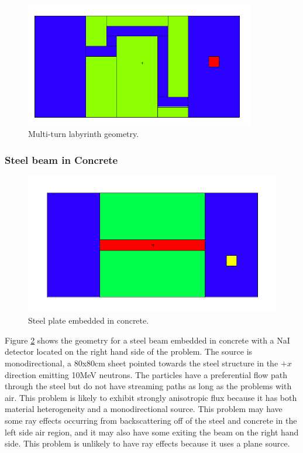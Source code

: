 \begin{figure}[h!]
  \centering
  \includegraphics[width=10cm]{./chapters/characterization_probs/figures/geometries/maze1.png}
  \caption[Multi-turn labyrinth geometry.]{Multi-turn labyrinth geometry.}
  \label{fig:maze1geom}
\end{figure}

\subsubsection*{Steel beam in Concrete}

\begin{figure}[h!]
  \centering
  \includegraphics[width=12cm]{./chapters/characterization_probs/figures/geometries/prob-1.png}
  \caption[Steel plate embedded in concrete.]{Steel plate embedded in concrete.}
  \label{fig:prob1geom}
\end{figure}

Figure \ref{fig:prob1geom} shows the geometry for a steel beam embedded in
concrete with a NaI detector located on the right hand side of the problem. The source is monodirectional, a 80x80cm sheet pointed 
towards the steel structure in the $+x$ direction emitting 10MeV neutrons.
The particles have a preferential flow path through the steel but do not
have streaming paths as long as the problems with air. 
This problem is likely to exhibit strongly anisotropic flux because it has both material heterogeneity and a monodirectional source. This problem may have some ray effects occurring from
backscattering off of the steel and concrete in the left side air region, and it
may also have some exiting the beam on the right hand side. This problem is unlikely to have ray effects because it uses a plane source. 

